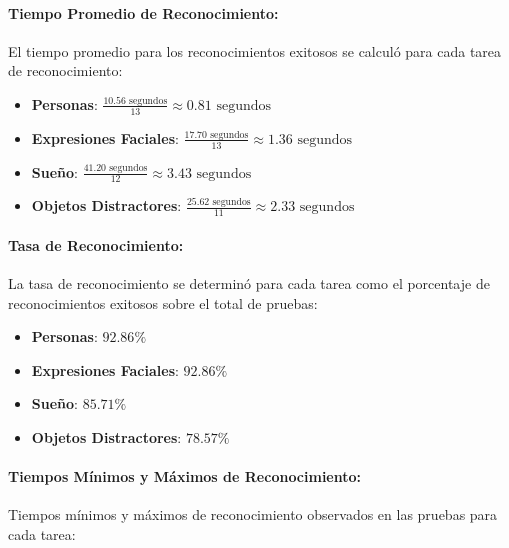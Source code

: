 \paragraph{Tiempo Promedio de Reconocimiento: }
El tiempo promedio para los reconocimientos exitosos se calculó para cada tarea de reconocimiento:

\begin{itemize}
\item \textbf{Personas}: \(\frac{10.56 \text{ segundos}}{13} \approx 0.81 \text{ segundos}\)
\item \textbf{Expresiones Faciales}: \(\frac{17.70 \text{ segundos}}{13} \approx 1.36 \text{ segundos}\)
\item \textbf{Sueño}: \(\frac{41.20 \text{ segundos}}{12} \approx 3.43 \text{ segundos}\)
\item \textbf{Objetos Distractores}: \(\frac{25.62 \text{ segundos}}{11} \approx 2.33 \text{ segundos}\)
\end{itemize}

\paragraph{Tasa de Reconocimiento: }
La tasa de reconocimiento se determinó para cada tarea como el porcentaje de reconocimientos exitosos sobre el total de pruebas:

\begin{itemize}
\item \textbf{Personas}: \(92.86\%\)
\item \textbf{Expresiones Faciales}: \(92.86\%\)
\item \textbf{Sueño}: \(85.71\%\)
\item \textbf{Objetos Distractores}: \(78.57\%\)
\end{itemize}

\paragraph{Tiempos Mínimos y Máximos de Reconocimiento: }
Tiempos mínimos y máximos de reconocimiento observados en las pruebas para cada tarea:

